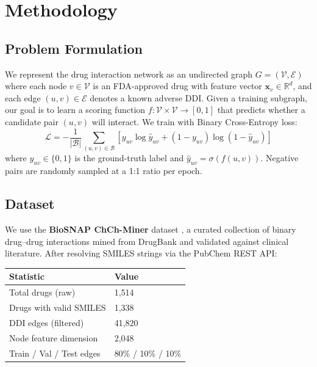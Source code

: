 \documentclass[11pt,a4paper]{article}
\begin{document}
\section{Methodology}

\subsection{Problem Formulation}
We represent the drug interaction network as an undirected graph
$G = (\mathcal{V}, \mathcal{E})$ where each node $v \in \mathcal{V}$
is an FDA-approved drug with feature vector $\mathbf{x}_v \in \mathbb{R}^d$,
and each edge $(u, v) \in \mathcal{E}$ denotes a known adverse DDI.
Given a training subgraph, our goal is to learn a scoring function
$f : \mathcal{V} \times \mathcal{V} \to [0, 1]$ that predicts whether a
candidate pair $(u, v)$ will interact.
We train with Binary Cross-Entropy loss:
\begin{equation}
  \mathcal{L} = -\frac{1}{|\mathcal{B}|}
  \sum_{(u,v) \in \mathcal{B}} \left[
    y_{uv} \log \hat{y}_{uv}
    + (1 - y_{uv}) \log (1 - \hat{y}_{uv})
  \right]
\end{equation}
where $y_{uv} \in \{0, 1\}$ is the ground-truth label and
$\hat{y}_{uv} = \sigma(f(u, v))$.
Negative pairs are randomly sampled at a 1:1 ratio per epoch.

\subsection{Dataset}
We use the \textbf{BioSNAP ChCh-Miner} dataset \cite{zitnik2018snap},
a curated collection of binary drug--drug interactions mined from
DrugBank and validated against clinical literature.
After resolving SMILES strings via the PubChem REST API:

\begin{center}
\begin{tabular}{ll}
\toprule
Statistic & Value \\
\midrule
Total drugs (raw)       & 1{,}514 \\
Drugs with valid SMILES & 1{,}338 \\
DDI edges (filtered)    & 41{,}820 \\
Node feature dimension  & 2{,}048 \\
Train / Val / Test edges & 80\% / 10\% / 10\% \\
\bottomrule
\end{tabular}
\end{center}
\end{document}
